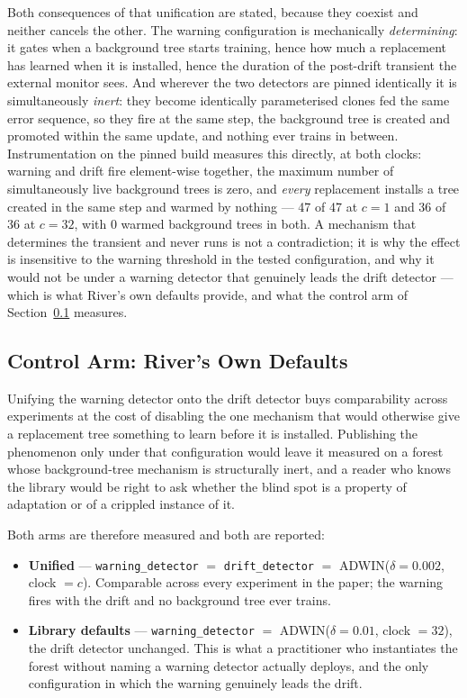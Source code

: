 Both consequences of that unification are stated, because they coexist and neither cancels the
other. The warning configuration is mechanically \emph{determining}: it gates when a background
tree starts training, hence how much a replacement has learned when it is installed, hence the
duration of the post-drift transient the external monitor sees. And wherever the two detectors are
pinned identically it is simultaneously \emph{inert}: they become identically parameterised clones
fed the same error sequence, so they fire at the same step, the background tree is created and
promoted within the same update, and nothing ever trains in between. Instrumentation on the pinned
build measures this directly, at both clocks: warning and drift fire element-wise together, the
maximum number of simultaneously live background trees is zero, and \emph{every} replacement
installs a tree created in the same step and warmed by nothing --- 47 of 47 at $c = 1$ and 36 of 36
at $c = 32$, with 0 warmed background trees in both. A mechanism that determines the transient and
never runs is not a contradiction; it is why the effect is insensitive to the warning threshold in
the tested configuration, and why it would not be under a warning detector that genuinely leads the
drift detector --- which is what River's own defaults provide, and what the control arm of
Section~\ref{sec:protocol_arms} measures.

\subsection{Control Arm: River's Own Defaults}\label{sec:protocol_arms}

Unifying the warning detector onto the drift detector buys comparability across experiments at the
cost of disabling the one mechanism that would otherwise give a replacement tree something to learn
before it is installed. Publishing the phenomenon only under that configuration would leave it
measured on a forest whose background-tree mechanism is structurally inert, and a reader who knows
the library would be right to ask whether the blind spot is a property of adaptation or of a
crippled instance of it.

Both arms are therefore measured and both are reported:

\begin{itemize}
  \item \textbf{Unified} --- \texttt{warning\_detector} $=$ \texttt{drift\_detector} $=$
        ADWIN($\delta = 0.002$, clock $= c$). Comparable across every experiment in the paper; the
        warning fires with the drift and no background tree ever trains.
  \item \textbf{Library defaults} --- \texttt{warning\_detector} $=$ ADWIN($\delta = 0.01$,
        clock $= 32$), the drift detector unchanged. This is what a practitioner who instantiates
        the forest without naming a warning detector actually deploys, and the only configuration in
        which the warning genuinely leads the drift.
\end{itemize}

